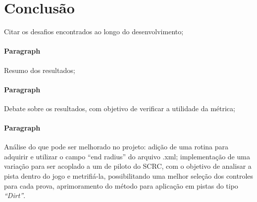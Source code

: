 \documentclass[journal]{IEEEtran}
\begin{document}
\section{Conclusão}
  Citar os desafios encontrados ao longo do desenvolvimento;
  \paragraph{Paragraph}
  Resumo dos resultados;
  \paragraph{Paragraph}
  Debate sobre os resultados, com objetivo de verificar a utilidade da métrica;
  \paragraph{Paragraph}
  Análise do que pode ser melhorado no projeto: adição de uma rotina para adquirir e utilizar o campo ``end radius'' do arquivo .xml; implementação de uma variação para ser acoplado a um de piloto do SCRC, com o objetivo de analisar a pista dentro do jogo e metrifiá-la, possibilitando uma melhor seleção dos controles para cada prova, aprimoramento do método para aplicação em pistas do tipo \textit{``Dirt''}.






%
\end{document}
